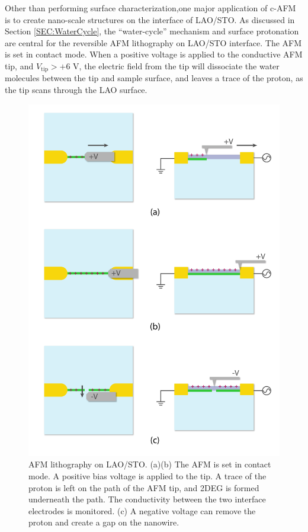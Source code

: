 \documentclass[pdflatex, sectionletters, 12pt, final, phd]{pittetd}    %
\begin{document}
Other than performing surface characterization,one major application of c-AFM is to create nano-scale structures on the interface of LAO/STO. As discussed in Section \ref{SEC:WaterCycle}, the ``water-cycle'' mechanism\cite{bi2010water} and surface protonation\cite{brown2016giant} are central for the reversible AFM lithography on LAO/STO interface. The AFM is set in contact mode. When a positive voltage is applied to the conductive AFM tip, and $V_\mathrm{tip} > +6$ V\cite{cen2008nanoscale}, the electric field from the tip will dissociate the water molecules between the tip and sample surface, and leaves a trace of the proton, as the tip scans through the LAO surface. 

\begin{figure}[p]
	\centering
	\includegraphics[width=.80\textwidth]{Drawing/Lithography.pdf}
	\caption[AFM lithography on LAO/STO]{AFM lithography on LAO/STO. (a)(b) The AFM is set in contact mode. A positive bias voltage is applied to the tip. A trace of the proton is left on the path of the AFM tip, and 2DEG is formed underneath the path. The conductivity between the two interface electrodes is monitored. (c) A negative voltage can remove the proton and create a gap on the nanowire.}
	\label{FIG:Lithography}
\end{figure}
\end{document}
